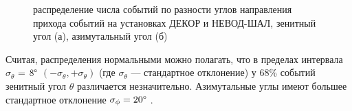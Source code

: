 \begin{figure}[ht]
    \centering

    \caption{распределение числа событий по разности углов направления прихода событий на установках ДЕКОР и НЕВОД-ШАЛ, зенитный угол (а), азимутальный угол (б)}
    \label{fig:muon_example}
\end{figure}


Считая, распределения нормальными можно полагать, что в пределах интервала \(\sigma_{\theta}\) = \(8\degree\) \((−\sigma_{\theta},+\sigma_{\theta})\) (где \(\sigma_{\theta}\) — стандартное отклонение) у 68\% событий зенитный угол \(\theta\) различается незначительно. Азимутальные углы имеют большее стандартное отклонение  \(\sigma_{\phi} = 20\degree\ \).

